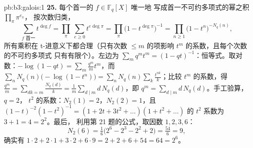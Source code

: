 \begin{solution}{pb:b3:galois:1}
\textbf{25.} 每个首一的 $f \in \mathbb F_q[X]$ 唯一地
写成首一不可约多项式的幂之积 $\prod_\pi\pi^{e_\pi}$，
按次数归类，
\[
\sum_{f \text{ 首一}}t^{\deg f}
= \prod_\pi\ \sum_{e \geq 0}t^{e\deg\pi}
= \prod_\pi\bigl(1 - t^{\deg\pi}\bigr)^{-1}
= \prod_{n \geq 1}\bigl(1 - t^n\bigr)^{-N_q(n)},
\]
所有乘积在 t-进意义下都合理（只有次数 $\leq m$
的项影响 $t^m$ 的系数，且每个次数的不可约多项式
只有有限个）。左边为 $\sum_m
q^mt^m = (1 - qt)^{-1}$：恒等式。取对数：$-\log(1 -
qt) = \sum_m\frac{q^m}mt^m$，而 $\sum_nN_q(n)\bigl(-\log(1
- t^n)\bigr) = \sum_nN_q(n)\sum_k\frac{t^{nk}}k$；比较
$t^m$ 的系数，得 $\frac{q^m}m = \sum_{dk = m}
\frac{N_q(d)}k = \frac1m\sum_{d \mid m}d\,N_q(d)$，即
$q^m = \sum_{d\mid m}d\,N_q(d)$。手工验算，$q = 2$，
$t^2$ 的系数：$N_2(1) = 2$，$N_2(2) = 1$，且
$(1 - t)^{-2}(1 - t^2)^{-1} = (1 + 2t + 3t^2 + \dots)(1 + t^2
+ \dots)$ 的 $t^2$ 系数为 $3 + 1 = 4 = 2^2$。最后，
利用第 21 题的公式，取因数 $1, 2, 3, 6$：
\[
N_2(6) = \tfrac16\bigl(2^6 - 2^3 - 2^2 + 2\bigr)
= \tfrac{54}6 = 9,
\]
确实有 $1\cdot2 + 2\cdot1 + 3\cdot2 + 6\cdot9 = 2 + 2 +
6 + 54 = 64 = 2^6$。
\end{solution}
